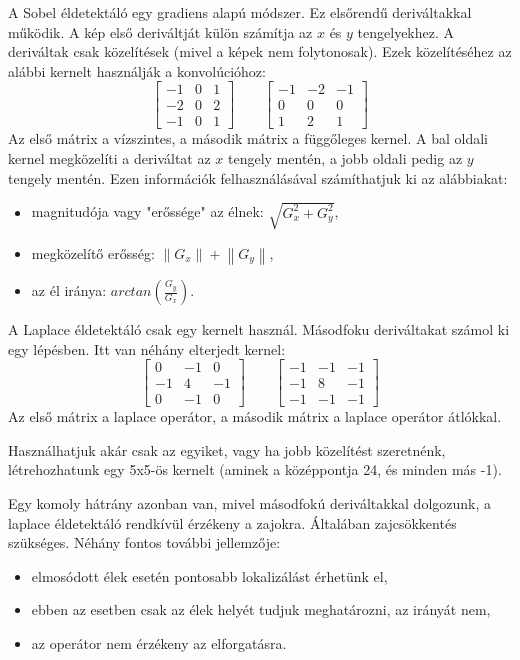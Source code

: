 A Sobel éldetektáló egy gradiens alapú módszer. Ez elsőrendű deriváltakkal működik. A kép első deriváltját külön számítja az $x$ és $y$ tengelyekhez. A deriváltak csak közelítések (mivel a képek nem folytonosak). Ezek közelítéséhez az alábbi kernelt használják a konvolúcióhoz:
$$\begin{bmatrix}
-1&0  &1 \\ 
-2&0  &2 \\ 
-1&0  &1 
\end{bmatrix} 
\qquad
\begin{bmatrix}
-1&-2  &-1 \\ 
0&0  &0 \\ 
1&2  &1 
\end{bmatrix}
$$
Az első mátrix a vízszintes, a második mátrix a függőleges kernel. A bal oldali kernel megközelíti a deriváltat az $x$ tengely mentén, a jobb oldali pedig az $y$ tengely mentén. Ezen információk felhasználásával számíthatjuk ki az alábbiakat:
\begin{itemize}
\item magnitudója vagy "erőssége" az élnek: $\sqrt{G_{x}^{2}+G_{y}^{2}}$,
\item megközelítő erősség: $ \left\| G_x \right \| + \left\| G_y \right \|$,
\item az él iránya: $arctan(\frac{G_y}{G_x})$.
\end{itemize}



A Laplace éldetektáló csak egy kernelt használ. Másodfoku deriváltakat számol ki egy lépésben. Itt van néhány elterjedt kernel:
$$\begin{bmatrix}
 0 & -1  & 0 \\ 
-1 &  4  &-1 \\ 
 0 & -1  & 0 
\end{bmatrix} 
\qquad
\begin{bmatrix}
-1 & -1 & -1 \\ 
-1 &  8 & -1 \\ 
-1 & -1 & -1 
\end{bmatrix}
$$
Az első mátrix a laplace operátor, a második mátrix a laplace operátor átlókkal.

Használhatjuk akár csak az egyiket, vagy ha jobb közelítést szeretnénk, létrehozhatunk egy 5x5-ös kernelt (aminek a középpontja 24, és minden más -1).

Egy komoly hátrány azonban van, mivel másodfokú deriváltakkal dolgozunk, a laplace éldetektáló rendkívül érzékeny a zajokra. Általában zajcsökkentés szükséges. Néhány fontos további jellemzője:
\begin{itemize}
\item elmosódott élek esetén pontosabb lokalizálást érhetünk el,
\item ebben az esetben csak az élek helyét tudjuk meghatározni, az irányát nem,
\item az operátor nem érzékeny az elforgatásra.
\end{itemize}

